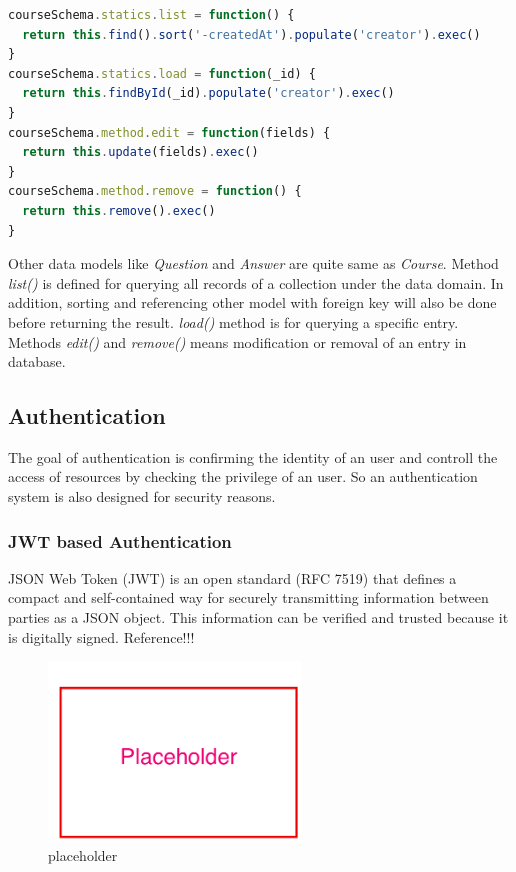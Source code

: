 \begin{lstlisting}[language=JavaScript, caption=Example: user schema definition within Mongoose, label={list:course-data-method-imp}]
courseSchema.statics.list = function() {
  return this.find().sort('-createdAt').populate('creator').exec()
}
courseSchema.statics.load = function(_id) {
  return this.findById(_id).populate('creator').exec()
}
courseSchema.method.edit = function(fields) {
  return this.update(fields).exec()
}
courseSchema.method.remove = function() {
  return this.remove().exec()
}
\end{lstlisting}

Other data models like \textit{Question} and \textit{Answer} are quite same as \textit{Course}. Method \textit{list()} is defined for querying all records of a collection under the data domain. In addition, sorting and referencing other model with foreign key will also be done before returning the result. \textit{load()} method is for querying a specific entry. Methods \textit{edit()} and \textit{remove()} means modification or removal of an entry in database.



\subsection{Authentication}
The goal of authentication is confirming the identity of an user and controll the access of resources by checking the privilege of an user. So an authentication system is also designed for security reasons.

\subsubsection{JWT based Authentication}
JSON Web Token (JWT) is an open standard (RFC 7519) that defines a compact and self-contained way for securely transmitting information between parties as a JSON object. This information can be verified and trusted because it is digitally signed. Reference!!!


\begin{figure}[!htbp]
  \centering
    \includegraphics[width=0.6\textwidth]{Figures/placeholder.png}
  \caption{placeholder}
  \label{fig:jwt-process-imp}
\end{figure}


